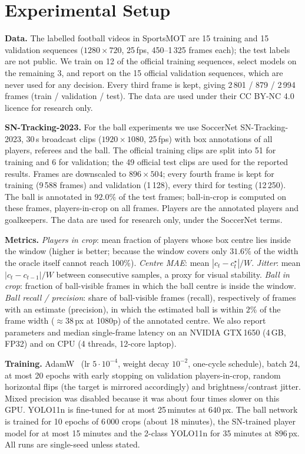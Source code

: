 \documentclass[conference]{IEEEtran}
\begin{document}
\section{Experimental Setup}
\textbf{Data.} The labelled football videos in SportsMOT are 15 training and 15 validation sequences ($1280{\times}720$, 25\,fps, 450--1\,325 frames each); the test labels are not public. We train on 12 of the official training sequences, select models on the remaining 3, and report on the 15 official validation sequences, which are never used for any decision. Every third frame is kept, giving 2\,801 / 879 / 2\,994 frames (train / validation / test). The data are used under their CC BY-NC 4.0 licence for research only.

\textbf{SN-Tracking-2023.} For the ball experiments we use SoccerNet SN-Tracking-2023, 30\,s broadcast clips ($1920{\times}1080$, 25\,fps) with box annotations of all players, referees and the ball. The official training clips are split into 51 for training and 6 for validation; the 49 official test clips are used for the reported results. Frames are downscaled to $896{\times}504$; every fourth frame is kept for training (9\,588 frames) and validation (1\,128), every third for testing (12\,250). The ball is annotated in $92.0\%$ of the test frames; ball-in-crop is computed on these frames, players-in-crop on all frames. Players are the annotated players and goalkeepers. The data are used for research only, under the SoccerNet terms.

\textbf{Metrics.} \emph{Players in crop}: mean fraction of players whose box centre lies inside the window (higher is better; because the window covers only $31.6\%$ of the width the oracle itself cannot reach 100\%). \emph{Centre MAE}: mean $|c_t-c^\star_t|/W$. \emph{Jitter}: mean $|c_t-c_{t-1}|/W$ between consecutive samples, a proxy for visual stability. \emph{Ball in crop}: fraction of ball-visible frames in which the ball centre is inside the window. \emph{Ball recall / precision}: share of ball-visible frames (recall), respectively of frames with an estimate (precision), in which the estimated ball is within $2\%$ of the frame width ($\approx38$\,px at 1080p) of the annotated centre. We also report parameters and median single-frame latency on an NVIDIA GTX\,1650 (4\,GB, FP32) and on CPU (4 threads, 12-core laptop).

\textbf{Training.} AdamW~\cite{loshchilov2019} (lr $5{\cdot}10^{-4}$, weight decay $10^{-2}$, one-cycle schedule), batch 24, at most 20 epochs with early stopping on validation players-in-crop, random horizontal flips (the target is mirrored accordingly) and brightness/contrast jitter. Mixed precision was disabled because it was about four times slower on this GPU. YOLO11n is fine-tuned for at most 25\,minutes at $640$\,px. The ball network is trained for 10 epochs of 6\,000 crops (about 18 minutes), the SN-trained player model for at most 15 minutes and the 2-class YOLO11n for 35 minutes at $896$\,px. All runs are single-seed unless stated.
\end{document}
